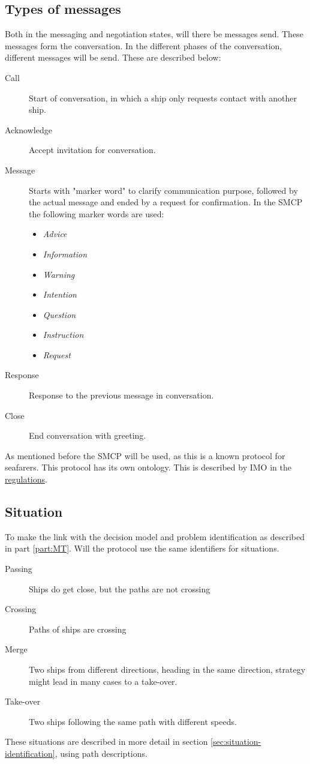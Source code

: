 \subsection{Types of messages}
Both in the messaging and negotiation states, will there be messages send. These messages form the conversation. In the different phases of the conversation, different messages will be send. These are described below:
\begin{description}
	\item [Call] Start of conversation, in which a ship only requests contact with another ship.
	\item [Acknowledge] Accept invitation for conversation.
	\item [Message] Starts with "marker word" to clarify communication purpose, followed by the actual message and ended by a request for confirmation. In the \ac{SMCP} the following marker words are used:
	\begin{itemize}
		\item \emph{Advice}
		\item \emph{Information}
		\item \emph{Warning}
		\item \emph{Intention}
		\item \emph{Question}
		\item \emph{Instruction}
		\item \emph{Request}
	\end{itemize}
	\item [Response] Response to the previous message in conversation.
	\item [Close] End conversation with greeting.
\end{description}
As mentioned before the \acf{SMCP} will be used, as this is a known protocol for seafarers. This protocol has its own ontology. This is described by \ac{IMO} in the \href{https://puc.overheid.nl/doc/PUC_1418_14/1/#16830}{regulations}.

\subsection{Situation}
To make the link with the decision model and problem identification as described in part \ref{part:MT}. Will the protocol use the same identifiers for situations. 
\begin{description}
	\item [Passing] Ships do get close, but the paths are not crossing
	\item [Crossing] Paths of ships are crossing
	\item [Merge] Two ships from different directions, heading in the same direction, strategy might lead in many cases to a take-over.
	\item [Take-over] Two ships following the same path with different speeds.
\end{description}
These situations are described in more detail in section \ref{sec:situation-identification}, using path descriptions.
